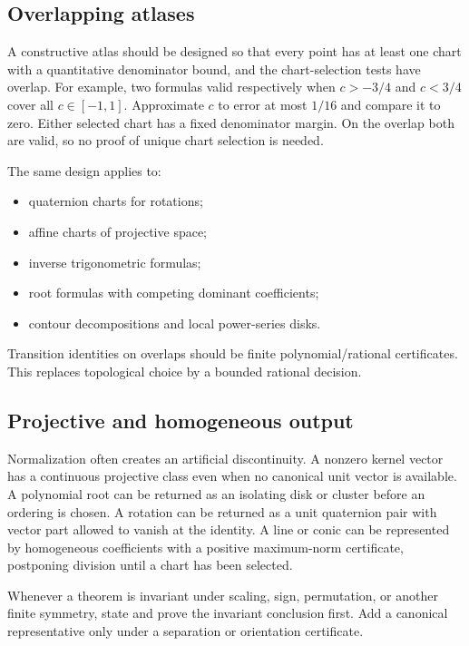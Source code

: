 \subsection{Overlapping atlases}

A constructive atlas should be designed so that every point has at least one
chart with a quantitative denominator bound, and the chart-selection tests
have overlap.  For example, two formulas valid respectively when
\(c>-3/4\) and \(c<3/4\) cover all \(c\in[-1,1]\).  Approximate \(c\) to
error at most \(1/16\) and compare it to zero.  Either selected chart has a
fixed denominator margin.  On the overlap both are valid, so no proof of
unique chart selection is needed.

The same design applies to:
\begin{itemize}
\item quaternion charts for rotations;
\item affine charts of projective space;
\item inverse trigonometric formulas;
\item root formulas with competing dominant coefficients;
\item contour decompositions and local power-series disks.
\end{itemize}

Transition identities on overlaps should be finite polynomial/rational
certificates.  This replaces topological choice by a bounded rational decision.

\subsection{Projective and homogeneous output}

Normalization often creates an artificial discontinuity.  A nonzero kernel
vector has a continuous projective class even when no canonical unit vector is
available.  A polynomial root can be returned as an isolating disk or cluster
before an ordering is chosen.  A rotation can be returned as a unit quaternion
pair with vector part allowed to vanish at the identity.  A line or conic can
be represented by homogeneous coefficients with a positive maximum-norm
certificate, postponing division until a chart has been selected.

\begin{principle}
Whenever a theorem is invariant under scaling, sign, permutation, or another
finite symmetry, state and prove the invariant conclusion first.  Add a
canonical representative only under a separation or orientation certificate.
\end{principle}

